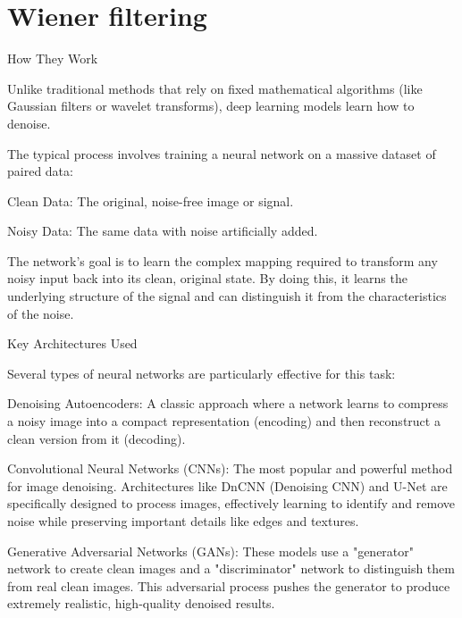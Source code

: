 \section{Wiener filtering}



How They Work

Unlike traditional methods that rely on fixed mathematical algorithms (like Gaussian filters or wavelet transforms), deep learning models learn how to denoise.

The typical process involves training a neural network on a massive dataset of paired data:

    Clean Data: The original, noise-free image or signal.

    Noisy Data: The same data with noise artificially added.

    The network's goal is to learn the complex mapping required to transform any noisy input back into its clean, original state. By doing this, it learns the underlying structure of the signal and can distinguish it from the characteristics of the noise.

Key Architectures Used

Several types of neural networks are particularly effective for this task:

    Denoising Autoencoders: A classic approach where a network learns to compress a noisy image into a compact representation (encoding) and then reconstruct a clean version from it (decoding).

Convolutional Neural Networks (CNNs): The most popular and powerful method for image denoising. Architectures like DnCNN (Denoising CNN) and U-Net are specifically designed to process images, effectively learning to identify and remove noise while preserving important details like edges and textures.

Generative Adversarial Networks (GANs): These models use a "generator" network to create clean images and a "discriminator" network to distinguish them from real clean images. This adversarial process pushes the generator to produce extremely realistic, high-quality denoised results.

